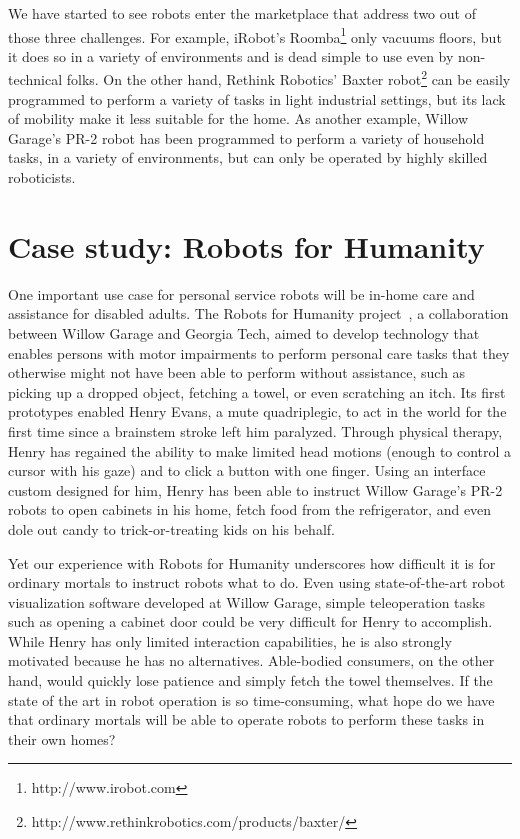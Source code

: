 \documentclass[10pt,twocolumn]{article}
\begin{document}
We have started to see robots enter the marketplace that address two out of those three challenges. For example, iRobot's Roomba\footnote{http://www.irobot.com} only vacuums floors, but it does so in a variety of environments and is dead simple to use even by non-technical folks. On the other hand, Rethink Robotics' Baxter robot\footnote{http://www.rethinkrobotics.com/products/baxter/} can be easily programmed to perform a variety of tasks in light industrial settings, but its lack of mobility make it less suitable for the home. As another example, Willow Garage's PR-2 robot has been programmed to perform a variety of household tasks, in a variety of environments, but can only be operated by highly skilled roboticists.

\section{Case study: Robots for Humanity}

One important use case for personal service robots will be in-home care and assistance for disabled adults. The Robots for Humanity project~\cite{rfh}, a collaboration between Willow Garage and Georgia Tech, aimed to develop technology that enables persons with motor impairments to perform personal care tasks that they otherwise might not have been able to perform without assistance, such as picking up a dropped object, fetching a towel, or even scratching an itch. Its first prototypes enabled Henry Evans, a mute quadriplegic, to act in the world for the first time since a brainstem stroke left him paralyzed. Through physical therapy, Henry has regained the ability to make limited head motions (enough to control a cursor with his gaze) and to click a button with one finger.  Using an interface custom designed for him, Henry has been able to instruct Willow Garage's PR-2 robots to open cabinets in his home, fetch food from the refrigerator, and even dole out candy to trick-or-treating kids on his behalf.

Yet our experience with Robots for Humanity underscores how difficult it is for ordinary mortals to instruct robots what to do. Even using state-of-the-art robot visualization software developed at Willow Garage, simple teleoperation tasks such as opening a cabinet door could be very difficult for Henry to accomplish. While Henry has only limited interaction capabilities, he is also strongly motivated because he has no alternatives. 
Able-bodied consumers, on the other hand, would quickly lose patience and simply fetch the towel themselves. If the state of the art in robot operation is so time-consuming, what hope do we have that ordinary mortals will be able to operate robots to perform these tasks in their own homes?
\end{document}
